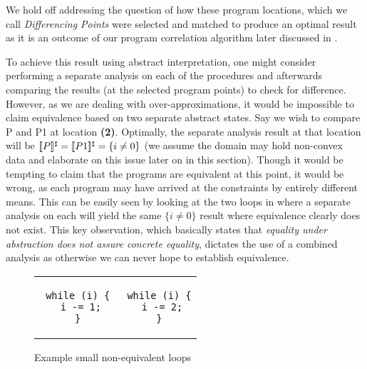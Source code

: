 We hold off addressing the question of how these program locations, which we call \emph{Differencing Points} were selected and matched to produce an optimal result as it is an outcome of our program correlation algorithm later discussed in .

To achieve this result using abstract interpretation, one might consider performing a separate analysis on each of the procedures and afterwards comparing the results (at the selected program points) to check for difference. However, as we are dealing with over-approximations, it would be impossible to claim equivalence based on two separate abstract states. Say we wish to compare P and P1 at location \textbf{(2)}. Optimally, the separate analysis result at that location will be $\lbrack\!\lbrack P \rbrack\!\rbrack^{\sharp} = \lbrack\!\lbrack P1 \rbrack\!\rbrack^{\sharp} = \{i \neq 0\}$ (we assume the domain may hold non-convex data and elaborate on this issue later on in this section). Though it would be tempting to claim that the programs are equivalent at this point, it would be wrong, as each program may have arrived at the constraints by entirely different means. This can be easily seen by looking at the two loops in  where a separate analysis on each will yield the same $\{i \neq 0\}$ result where equivalence clearly does not exist. This key observation, which basically states that \emph{equality under abstraction does not assure concrete equality}, dictates the use of a combined analysis as otherwise we can never hope to establish equivalence.

\begin{figure}
\centering
\begin{tabular}{cc}
\begin{lstlisting}
 while (i) {
  i -= 1;
 }
\end{lstlisting}
&
\begin{lstlisting}
 while (i) {
  i -= 2;
 }
\end{lstlisting}
\end{tabular}
\caption{Example small non-equivalent loops}
\end{figure}

